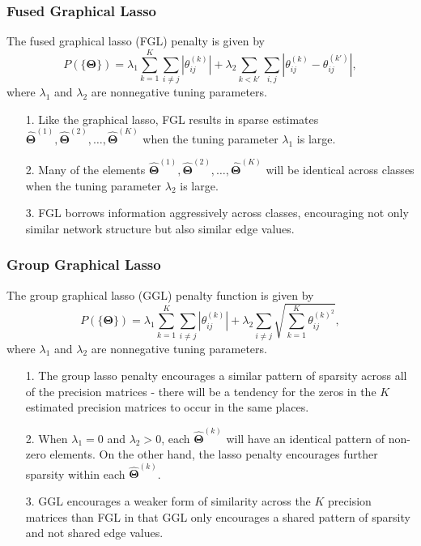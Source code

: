 \documentclass[t]{beamer}
\begin{document}
\begin{frame}
\frametitle{Fused Graphical Lasso}
The fused graphical lasso (FGL) penalty is given by
\small
\begin{equation*}
P(\{\bm{\Theta}\}) = \lambda_{1}\sum_{k=1}^{K}\sum_{i\neq j}|\theta_{ij}^{(k)}| + \lambda_{2}\sum_{k<k'}\sum_{i,j}|\theta_{ij}^{(k)}-\theta_{ij}^{(k')}|,
\end{equation*}
\normalsize
where $\lambda_{1}$ and $\lambda_{2}$ are nonnegative tuning parameters.

\bigskip
\pause
\begin{itemize}
	\item[1.] Like the graphical lasso, FGL results in sparse estimates $\hat{\bm{\Theta}}^{(1)},\hat{\bm{\Theta}}^{(2)},\ldots,\hat{\bm{\Theta}}^{(K)}$ when the tuning parameter $\lambda_{1}$ is large.
	
	\bigskip
	\pause
	\item[2.] Many of the elements $\hat{\bm{\Theta}}^{(1)},\hat{\bm{\Theta}}^{(2)},\ldots,\hat{\bm{\Theta}}^{(K)}$ will be identical across classes when the tuning parameter $\lambda_{2}$ is large.
	
	\bigskip
	\pause
	\item[3.] FGL borrows information aggressively across classes, encouraging not only similar network structure but also similar edge values.
\end{itemize}
\end{frame}

\begin{frame}
\frametitle{Group Graphical Lasso}
The group graphical lasso (GGL) penalty function is given by
\small
\begin{equation*}
P(\{\bm{\Theta}\}) = \lambda_{1}\sum_{k=1}^{K}\sum_{i\neq j}|\theta_{ij}^{(k)}| + \lambda_{2}\sum_{i\neq j}\sqrt{\sum_{k=1}^{K}\theta_{ij}^{(k)^{2}}},
\end{equation*}
\normalsize
where $\lambda_{1}$ and $\lambda_{2}$ are nonnegative tuning parameters.

\bigskip
\pause
\begin{itemize}
	\item[1.] The group lasso penalty encourages a similar pattern of sparsity across all of the precision matrices - there will be a tendency for the zeros in the $K$ estimated precision matrices to occur in the same places.
	
	\bigskip
	\pause
	\item[2.] When $\lambda_{1} = 0$ and $\lambda_{2} > 0$, each $\hat{\bm{\Theta}}^{(k)}$ will have an identical pattern of non-zero elements. On the other hand, the lasso penalty encourages further sparsity within each $\hat{\bm{\Theta}}^{(k)}$.
	
	\bigskip
	\pause
	\item[3.] GGL encourages a weaker form of similarity across the $K$ precision matrices than FGL in that GGL only encourages a shared pattern of sparsity and not shared edge values.
	\end{itemize}
\end{frame}
\end{document}
